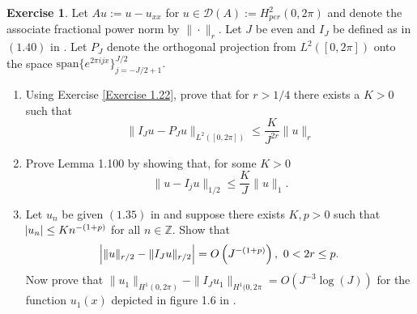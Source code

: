 \documentclass{amsart}
\theoremstyle{plain}
\theoremstyle{definition}
\newtheorem{exer}{Exercise}[section]
\newcommand{\Z}{\mathbb{Z}}
\begin{document}
\begin{exer}
    Let $Au := u-u_{xx}$ for $u\in \mathcal{D}(A):=H^2_{per}(0,2\pi)$ and denote the associate fractional power norm by $\|\cdot\|_{r}.$ Let $J$ be even and $I_J$ be defined as in $(1.40)$ in \cite{lord2014introduction}.  Let $P_{J}$ denote the orthogonal projection from $L^2([0,2\pi])$ onto the space $\text{span}\{e^{2\pi i j x}\}_{j=-J/2+1}^{J/2}.$
    \begin{enumerate}[label=\alph*.]
        \item Using Exercise \ref{Exercise 1.22}, prove that for $r>1/4$ there exists a $K>0$ such that
        $$\|I_{J}u - P_{J}u\|_{L^2([0,2\pi])} \leq \frac{K}{J^{2r}}\|u\|_{r}$$
        \item Prove Lemma 1.100 by showing that, for some $K > 0$
        $$\|u-I_{j}u\|_{1/2} \leq \frac{K}{J} \|u\|_{1}.$$
        \item Let $u_n$ be given $(1.35)$ in \cite{lord2014introduction} and suppose there exists $K,p > 0$ such that $\abs{u_n} \leq Kn^{-(1+p)}$ for all $n\in\Z.$ Show that 
        $$\abs{\|u\|_{r/2}-\|I_{J}u\|_{r/2}} = O\left(J^{-(1+p)}\right), \ 0 < 2r \leq p.$$
        Now prove that $\|u_1\|_{H^1(0,2\pi)}-\|I_J u_1\|_{H^1(0,2\pi} = O\left(J^{-3}\log(J)\right)$ for the function $u_1(x)$ depicted in figure 1.6 in \cite{lord2014introduction}. 
    \end{enumerate}
\end{exer}
\end{document}
